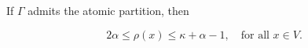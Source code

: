 If $\Gamma$ admits the atomic partition, then

$$2\alpha \leq \rho(x) \leq \kappa + \alpha - 1, \quad \text{for all } x \in V.$$
